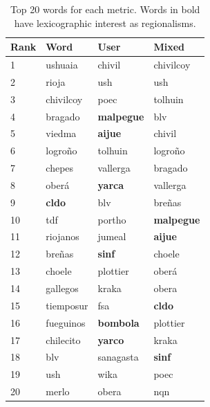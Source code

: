 \begin{table}[h]
\begin{tabular}{llll}
{Rank} &       Word &        User     &  Mixed \\
\hline
1  &        ushuaia &          chivil &       chivilcoy \\ 
2  &          rioja &            ush  &             ush \\
3  &      chivilcoy &            poec &         tolhuin \\
4  &        bragado &\textbf{malpegue}&             blv \\
5  &         viedma &   \textbf{aijue}&          chivil \\
6  &        logroño &         tolhuin &         logroño \\
7  &         chepes &        vallerga &         bragado \\
8  &          oberá &  \textbf{yarca} &        vallerga \\
9  &  \textbf{cldo} &             blv &          breñas \\
10 &            tdf &          portho &\textbf{malpegue}\\
11 &       riojanos &          jumeal &  \textbf{aijue} \\
12 &         breñas &   \textbf{sinf} &          choele \\
13 &         choele &        plottier &           oberá \\
14 &       gallegos &           kraka &           obera \\
15 &      tiemposur &             fsa &   \textbf{cldo} \\
16 &      fueguinos & \textbf{bombola}&        plottier \\
17 &      chilecito &  \textbf{yarco} &           kraka \\
18 &            blv &       sanagasta &   \textbf{sinf} \\
19 &            ush &            wika &            poec \\
20 &          merlo &           obera &             nqn \\
\hline
\end{tabular}
\caption{Top 20 words for each metric. Words in bold have lexicographic interest as regionalisms.}
\label{tab:20_top_words}
\end{table}

